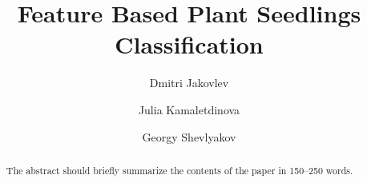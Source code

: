 \documentclass[runningheads]{llncs}
\begin{document}
%
\title{Feature Based Plant Seedlings Classification}
%
\author{Dmitri Jakovlev \and Julia Kamaletdinova \and Georgy Shevlyakov}
%
%

%
\maketitle              %
%
\begin{abstract}
The abstract should briefly summarize the contents of the paper in
150--250 words.

\end{abstract}
%
%
%









%
%


\end{document}
